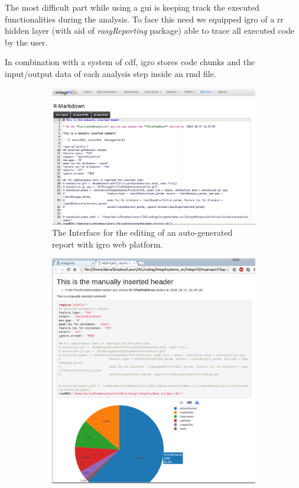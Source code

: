 The most difficult part while using a \gls{gui} is keeping track the executed functionalities during the analysis.
To face this need we equipped \gls{igro} of a \gls{rr} hidden layer (with aid of \textit{easyReporting} package) able to trace all executed code by the user.

In combination with a system of \gls{cdf}, \gls{igro} stores code chunks and the input/output data of each analysis step inside an \gls{rmd} file.

\begin{figure}
\centering
\begin{subfigure}{.5\textwidth}
  \centering
  \includegraphics[width=.9\linewidth]{img/integrho/rr_1.png}
  \caption{The Interface for the editing of an auto-generated report with \gls{igro} web platform.}
  \label{fig:integrhorr1}
\end{subfigure}%
\begin{subfigure}{.5\textwidth}
  \centering
  \includegraphics[width=.9\linewidth]{img/integrho/rr_2.png}

\end{subfigure}
\end{figure}
